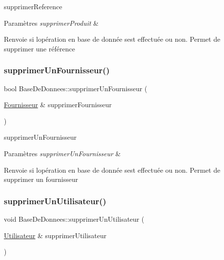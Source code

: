 supprimer\+Reference 


\begin{DoxyParams}{Paramètres}
{\em supprimer\+Produit} & \\
\hline
\end{DoxyParams}
\begin{DoxyReturn}{Renvoie}
si l\textquotesingle{}opération en base de donnée s\textquotesingle{}est effectuée ou non. Permet de supprimer une référence 
\end{DoxyReturn}
\mbox{\label{class_base_de_donnees_a4782a41060ec75d8343cb318b3b29a45}} 
\subsubsection{\texorpdfstring{supprimer\+Un\+Fournisseur()}{supprimerUnFournisseur()}}
{\footnotesize\ttfamily bool Base\+De\+Donnees\+::supprimer\+Un\+Fournisseur (\begin{DoxyParamCaption}\item[{\mbox{\hyperlink{class_fournisseur}{Fournisseur}} \&}]{supprimer\+Fournisseur }\end{DoxyParamCaption})}



supprimer\+Un\+Fournisseur 


\begin{DoxyParams}{Paramètres}
{\em supprimer\+Un\+Fournisseur} & \\
\hline
\end{DoxyParams}
\begin{DoxyReturn}{Renvoie}
si l\textquotesingle{}opération en base de donnée s\textquotesingle{}est effectuée ou non. Permet de supprimer un fournisseur 
\end{DoxyReturn}
\mbox{\label{class_base_de_donnees_a7ead23bc4e5d3bc897d9c6a412bbc0a6}} 
\subsubsection{\texorpdfstring{supprimer\+Un\+Utilisateur()}{supprimerUnUtilisateur()}}
{\footnotesize\ttfamily void Base\+De\+Donnees\+::supprimer\+Un\+Utilisateur (\begin{DoxyParamCaption}\item[{\mbox{\hyperlink{class_utilisateur}{Utilisateur}} \&}]{supprimer\+Utilisateur }\end{DoxyParamCaption})}



